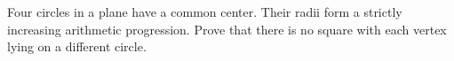 Four circles in a plane have a common center. Their radii form a strictly increasing arithmetic progression. Prove that there is no square with each vertex lying on a different circle.
